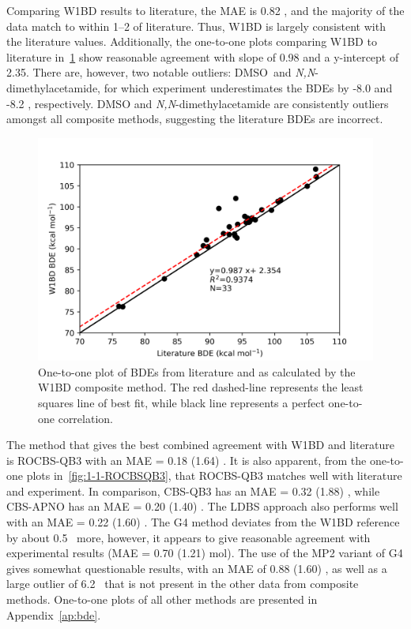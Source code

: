 Comparing W1BD results to literature, the MAE is 0.82 \kcalmol, and the majority of the data match to within 1--2 \kcalmol of literature. Thus, W1BD is largely consistent with the literature values. Additionally, the one-to-one plots comparing W1BD to literature in~\ref{fig:1-1-W1BD} show reasonable agreement with slope of 0.98 and a y-intercept of 2.35. There are, however, two notable outliers: DMSO\footnotemark\ and \emph{N,N}-dimethylacetamide, for which experiment underestimates the BDEs by -8.0 and -8.2 \kcalmol, respectively. DMSO and \emph{N,N}-dimethylacetamide are consistently outliers amongst all composite methods, suggesting the literature BDEs are incorrect.


\begin{figure}[H]
  \centering
  \includegraphics[width=\textwidth]{figures/lit-w1bd}
  \caption[One-to-one plot of BDEs from literature and as calculated by the W1BD composite method.]{One-to-one plot of BDEs from literature\protect\cite{Luo2002} and as calculated by the W1BD composite method. The red dashed-line represents the least squares line of best fit, while black line represents a perfect one-to-one correlation.}
  \label{fig:1-1-W1BD}
\end{figure}

The method that gives the best combined agreement with W1BD and literature is ROCBS-QB3 with an MAE = 0.18 (1.64) \kcalmol. It is also apparent, from the one-to-one plots in~\ref{fig:1-1-ROCBSQB3}, that ROCBS-QB3 matches well with literature and experiment. In comparison, CBS-QB3 has an MAE = 0.32 (1.88) \kcalmol, while CBS-APNO has an MAE = 0.20 (1.40) \kcalmol. The LDBS approach also performs well with an MAE = 0.22 (1.60) \kcalmol. The G4 method deviates from the W1BD reference by about 0.5 \kcalmol\ more, however, it appears to give reasonable agreement with experimental results (MAE = 0.70 (1.21) mol). The use of the MP2 variant of G4 gives somewhat questionable results, with an MAE of 0.88 (1.60) \kcalmol, as well as a large outlier of 6.2 \kcalmol\ that is not present in the other data from composite methods. One-to-one plots of all other methods are presented in Appendix~\ref{ap:bde}.

